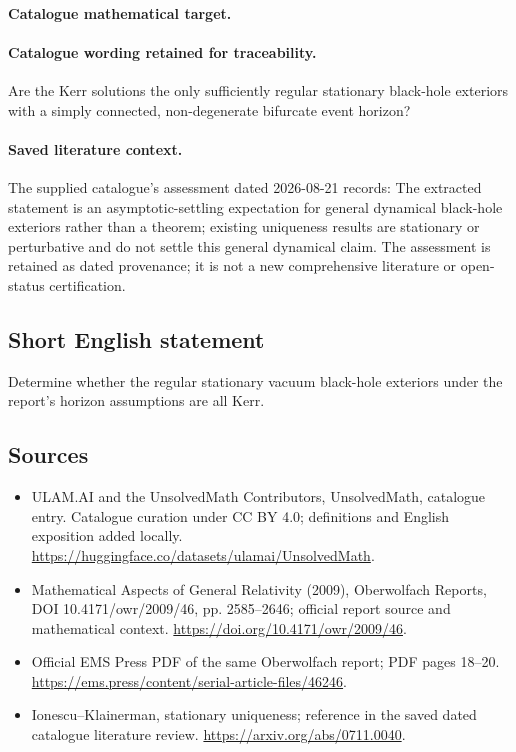 \documentclass[11pt]{article}
\begin{document}
\paragraph{Catalogue mathematical target.}
\paragraph{Catalogue wording retained for traceability.}
Are the Kerr solutions the only sufficiently regular stationary black-hole exteriors with a simply connected, non-degenerate bifurcate event horizon?

\paragraph{Saved literature context.} The supplied catalogue's assessment dated 2026-08-21 records: The extracted statement is an asymptotic-settling expectation for general dynamical black-hole exteriors rather than a theorem; existing uniqueness results are stationary or perturbative and do not settle this general dynamical claim. The assessment is retained as dated provenance; it is not a new comprehensive literature or open-status certification.
\subsection{Short English statement}
Determine whether the regular stationary vacuum black-hole exteriors under the report's horizon assumptions are all Kerr.
\subsection{Sources}
\begin{itemize}
\item[\hypertarget{source:statement:1}{S1}] ULAM.AI and the UnsolvedMath Contributors, UnsolvedMath, catalogue entry. Catalogue curation under CC BY 4.0; definitions and English exposition added locally.
\url{https://huggingface.co/datasets/ulamai/UnsolvedMath}.
\item[\hypertarget{source:statement:2}{S2}] Mathematical Aspects of General Relativity (2009), Oberwolfach Reports, DOI 10.4171/owr/2009/46, pp. 2585--2646; official report source and mathematical context.
\url{https://doi.org/10.4171/owr/2009/46}.
\item[\hypertarget{source:statement:3}{S3}] Official EMS Press PDF of the same Oberwolfach report; PDF pages 18--20.
\url{https://ems.press/content/serial-article-files/46246}.
\item[\hypertarget{source:statement:4}{S4}] Ionescu--Klainerman, stationary uniqueness; reference in the saved dated catalogue literature review.
\url{https://arxiv.org/abs/0711.0040}.
\end{itemize}
\label{end:statement}
\end{document}
